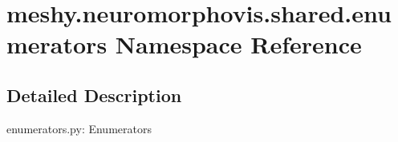 \hypertarget{namespacemeshy_1_1neuromorphovis_1_1shared_1_1enumerators}{}\section{meshy.\+neuromorphovis.\+shared.\+enumerators Namespace Reference}
\label{namespacemeshy_1_1neuromorphovis_1_1shared_1_1enumerators}


\subsection{Detailed Description}
\begin{DoxyVerb}enumerators.py:
    Enumerators
\end{DoxyVerb}
 